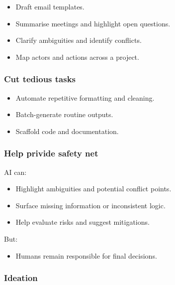 \documentclass[
  letterpaper,
  DIV=11,
  numbers=noendperiod]{scrreprt}
\providecommand{\tightlist}{%
  \setlength{\itemsep}{0pt}\setlength{\parskip}{0pt}}
\begin{document}
\begin{itemize}
\tightlist
\item
  Draft email templates.
\item
  Summarise meetings and highlight open questions.
\item
  Clarify ambiguities and identify conflicts.
\item
  Map actors and actions across a project.
\end{itemize}

\subsubsection{Cut tedious tasks}\label{cut-tedious-tasks}

\begin{itemize}
\tightlist
\item
  Automate repetitive formatting and cleaning.
\item
  Batch-generate routine outputs.
\item
  Scaffold code and documentation.
\end{itemize}

\subsubsection{Help privide safety net}\label{help-privide-safety-net}

AI can:

\begin{itemize}
\tightlist
\item
  Highlight ambiguities and potential conflict points.
\item
  Surface missing information or inconsistent logic.
\item
  Help evaluate risks and suggest mitigations.
\end{itemize}

But:

\begin{itemize}
\tightlist
\item
  Humans remain responsible for final decisions.
\end{itemize}

\subsubsection{Ideation}\label{ideation}
\end{document}
